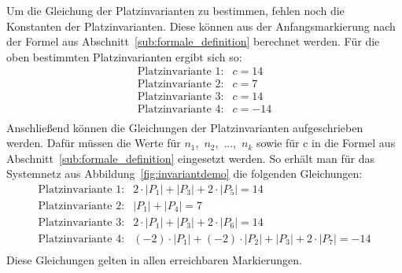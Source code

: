 		Um die Gleichung der Platzinvarianten zu bestimmen, fehlen noch die Konstanten der Platzinvarianten. Diese können aus der Anfangsmarkierung nach der Formel aus Abschnitt~\ref{sub:formale_definition} berechnet werden. Für die oben bestimmten Platzinvarianten ergibt sich so:
		$$
		\begin{matrix}
			\text{Platzinvariante 1}: & c = 14 	\\
			\text{Platzinvariante 2}: & c = 7 	\\
			\text{Platzinvariante 3}: & c = 14 	\\
			\text{Platzinvariante 4}: & c = -14 \\
		\end{matrix}
		$$
		Anschließend können die Gleichungen der Platzinvarianten aufgeschrieben werden. Dafür müssen die Werte für $n_1$,~$n_2$,~...,~$n_k$ sowie für c in die Formel aus Abschnitt~\ref{sub:formale_definition} eingesetzt werden. So erhält man für das Systemnetz aus Abbildung~\ref{fig:invariantdemo} die folgenden Gleichungen:
		$$
		\begin{matrix}
			\text{Platzinvariante 1}: & 2 \cdot |P_1| + |P_3| + 2 \cdot |P_5| = 14 \\
			\text{Platzinvariante 2}: & |P_1| + |P_4| = 7 \\
			\text{Platzinvariante 3}: & 2 \cdot |P_1| + |P_3| + 2 \cdot |P_6| = 14 \\
			\text{Platzinvariante 4}: & (-2) \cdot |P_1| + (-2) \cdot |P_2| + |P_3| + 2 \cdot |P_7|= -14 \\
		\end{matrix}
		$$
		Diese Gleichungen gelten in allen erreichbaren Markierungen.

